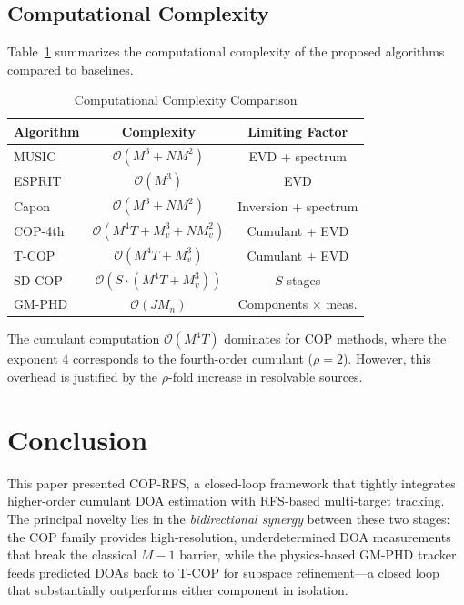 \documentclass[journal]{IEEEtran}
\begin{document}
\subsection{Computational Complexity}

Table~\ref{tab:complexity} summarizes the computational complexity of the proposed algorithms compared to baselines.

\begin{table}[t]
\centering
\caption{Computational Complexity Comparison}
\label{tab:complexity}
\begin{tabular}{lcc}
\toprule
\textbf{Algorithm} & \textbf{Complexity} & \textbf{Limiting Factor} \\
\midrule
MUSIC & $\mathcal{O}(M^3 + NM^2)$ & EVD + spectrum \\
ESPRIT & $\mathcal{O}(M^3)$ & EVD \\
Capon & $\mathcal{O}(M^3 + NM^2)$ & Inversion + spectrum \\
COP-4th & $\mathcal{O}(M^4T + M_v^3 + NM_v^2)$ & Cumulant + EVD \\
T-COP & $\mathcal{O}(M^4T + M_v^3)$ & Cumulant + EVD \\
SD-COP & $\mathcal{O}(S \cdot (M^4T + M_v^3))$ & $S$ stages \\
GM-PHD & $\mathcal{O}(JM_n)$ & Components $\times$ meas. \\
\bottomrule
\end{tabular}
\end{table}

The cumulant computation $\mathcal{O}(M^4 T)$ dominates for COP methods, where the exponent $4$ corresponds to the fourth-order cumulant ($\rho = 2$). However, this overhead is justified by the $\rho$-fold increase in resolvable sources.

\section{Conclusion}
\label{sec:conclusion}

This paper presented COP-RFS, a closed-loop framework that tightly integrates higher-order cumulant DOA estimation with RFS-based multi-target tracking. The principal novelty lies in the \emph{bidirectional synergy} between these two stages: the COP family provides high-resolution, underdetermined DOA measurements that break the classical $M{-}1$ barrier, while the physics-based GM-PHD tracker feeds predicted DOAs back to T-COP for subspace refinement---a closed loop that substantially outperforms either component in isolation.
\end{document}
